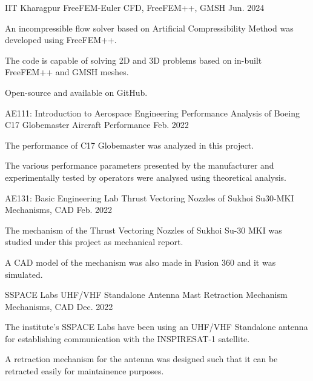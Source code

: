 \begin{cventries}
  \cventry
  {IIT Kharagpur} %
  {FreeFEM-Euler} %
  {CFD, FreeFEM++, GMSH} %
  {Jun. 2024} %
  {
    \begin{cvitems} %
      \item {An incompressible flow solver based on Artificial Compressibility Method was developed using FreeFEM++.}
      \item {The code is capable of solving 2D and 3D problems based on in-built FreeFEM++ and GMSH meshes.}
      \item {Open-source and available on GitHub.}
    \end{cvitems}
  }
  \cventry
  {AE111: Introduction to Aerospace Engineering} %
  {Performance Analysis of Boeing C17 Globemaster} %
  {Aircraft Performance} %
  {Feb. 2022} %
  {
    \begin{cvitems} %
      \item {The performance of C17 Globemaster was analyzed in this project.}
      \item {The various performance parameters presented by the manufacturer and experimentally tested by operators were analysed using theoretical analysis.}
    \end{cvitems}
  }

  \cventry
  {AE131: Basic Engineering Lab} %
  {Thrust Vectoring Nozzles of Sukhoi Su30-MKI} %
  {Mechanisms, CAD} %
  {Feb. 2022} %
  {
    \begin{cvitems} %
      \item {The mechanism of the Thrust Vectoring Nozzles of Sukhoi Su-30 MKI was studied under this project as mechanical report.}
      \item { A CAD model of the mechanism was also made in Fusion 360 and it was simulated.}
    \end{cvitems}
  }

  \cventry
  {SSPACE Labs} %
  {UHF/VHF Standalone Antenna Mast Retraction Mechanism} %
  {Mechanisms, CAD} %
  {Dec. 2022} %
  {
    \begin{cvitems} %
      \item {The institute's SSPACE Labs have been using an UHF/VHF Standalone antenna for establishing communication with the INSPIRESAT-1 satellite.}
      \item {A retraction mechanism for the antenna was designed such that it can be retracted easily for maintainence purposes.}
    \end{cvitems}
  }
\end{cventries}
